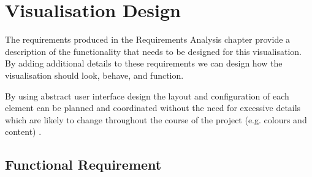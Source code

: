 \section{Visualisation Design}
The requirements produced in the Requirements Analysis chapter provide a
description of the functionality that needs to be designed for this
visualisation. By adding additional details to these requirements we can design
how the visualisation should look, behave, and function.

By using abstract user interface design the layout and configuration of each
element can be
planned and coordinated without the need for excessive details which are likely
to change
throughout the course of the project (e.g. colours and content) \cite{martin}.

\subsection{Functional Requirement}
